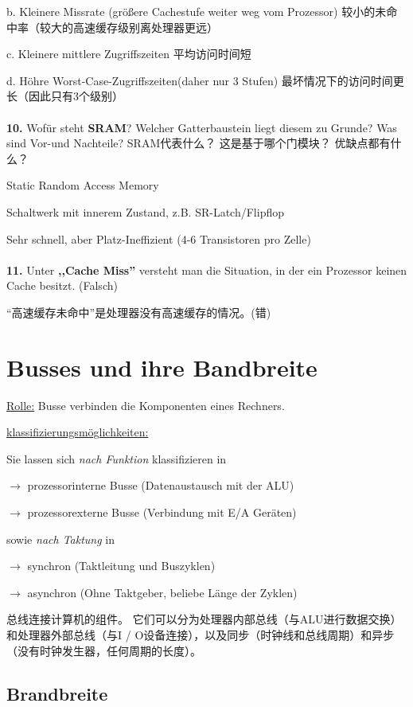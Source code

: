 \documentclass[fleqn]{article}
\begin{document}
b. Kleinere Missrate (größere Cachestufe weiter weg vom Prozessor) 较小的未命中率（较大的高速缓存级别离处理器更远）

c. Kleinere mittlere Zugriffszeiten 平均访问时间短

d. Höhre Worst-Case-Zugriffszeiten(daher nur 3 Stufen) 最坏情况下的访问时间更长（因此只有3个级别）
\\
\\
\noindent\textbf{10.} Wofür steht \textbf{SRAM}? Welcher Gatterbaustein liegt diesem zu Grunde? Was sind Vor-und Nachteile?
SRAM代表什么？ 这是基于哪个门模块？ 优缺点都有什么？

Static Random Access Memory

Schaltwerk mit innerem Zustand, z.B. SR-Latch/Flipflop

Sehr schnell, aber Platz-Ineffizient (4-6 Transistoren pro Zelle)
\\
\\
\noindent\textbf{11.} Unter \textbf{,,Cache Miss''} versteht man die Situation, in der ein Prozessor keinen Cache besitzt. (Falsch)

“高速缓存未命中”是处理器没有高速缓存的情况。(错)


\section{Busses und ihre Bandbreite}

\noindent\underline{Rolle:} Busse verbinden die Komponenten eines Rechners. 

\noindent\underline{klassifizierungsmöglichkeiten:} 

Sie lassen sich \textit{nach Funktion} klassifizieren in 

\indent\indent$\rightarrow$ prozessorinterne Busse (Datenaustausch mit der ALU) 

\indent\indent$\rightarrow$ prozessorexterne Busse (Verbindung mit E/A Geräten)

sowie \textit{nach Taktung} in 

\indent\indent$\rightarrow$ synchron (Taktleitung und Buszyklen) 

\indent\indent$\rightarrow$ asynchron (Ohne Taktgeber, beliebe Länge der Zyklen)

总线连接计算机的组件。 它们可以分为处理器内部总线（与ALU进行数据交换）和处理器外部总线（与I / O设备连接），以及同步（时钟线和总线周期）和异步（没有时钟发生器，任何周期的长度）。

\subsection{Brandbreite}
\end{document}
